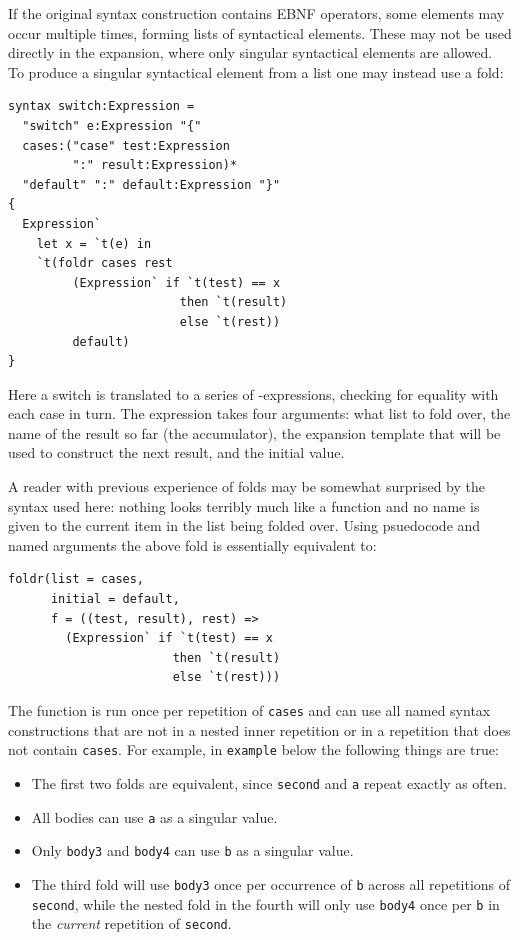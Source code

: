 \documentclass{kththesis}
\begin{document}
If the original syntax construction contains EBNF operators, some elements may occur multiple times, forming lists of syntactical elements. These may not be used directly in the expansion, where only singular syntactical elements are allowed. To produce a singular syntactical element from a list one may instead use a fold:

\begin{verbatim}
syntax switch:Expression =
  "switch" e:Expression "{"
  cases:("case" test:Expression
         ":" result:Expression)*
  "default" ":" default:Expression "}"
{
  Expression`
    let x = `t(e) in
    `t(foldr cases rest
         (Expression` if `t(test) == x
                        then `t(result)
                        else `t(rest))
         default)
}
\end{verbatim}

Here a switch is translated to a series of -expressions, checking for equality with each case in turn. The  expression takes four arguments: what list to fold over, the name of the result so far (the accumulator), the expansion template that will be used to construct the next result, and the initial value.

A reader with previous experience of folds may be somewhat surprised by the syntax used here: nothing looks terribly much like a function and no name is given to the current item in the list being folded over. Using psuedocode and named arguments the above fold is essentially equivalent to:

\begin{verbatim}
foldr(list = cases,
      initial = default,
      f = ((test, result), rest) =>
        (Expression` if `t(test) == x
                       then `t(result)
                       else `t(rest)))
\end{verbatim}

The function is run once per repetition of \texttt{cases} and can use all named syntax constructions that are not in a nested inner repetition or in a repetition that does not contain \texttt{cases}. For example, in \texttt{example} below the following things are true:
\begin{itemize}
  \item The first two folds are equivalent, since \texttt{second} and \texttt{a} repeat exactly as often.
  \item All bodies can use \texttt{a} as a singular value.
  \item Only \texttt{body3} and \texttt{body4} can use \texttt{b} as a singular value.
  \item The third fold will use \texttt{body3} once per occurrence of \texttt{b} across all repetitions of \texttt{second}, while the nested fold in the fourth will only use \texttt{body4} once per \texttt{b} in the \emph{current} repetition of \texttt{second}.
\end{itemize}
\end{document}
